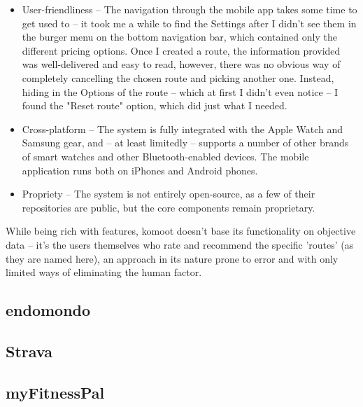 \begin{itemize}
    \item User-friendliness -- The navigation through the mobile app takes some time to get used to -- it took me a while to find the Settings after I didn't see them in the burger menu on the bottom navigation bar, which contained only the different pricing options.
    Once I created a route, the information provided was well-delivered and easy to read, however, there was no obvious way of completely cancelling the chosen route and picking another one.
    Instead, hiding in the Options of the route -- which at first I didn't even notice -- I found the "Reset route" option, which did just what I needed.
    \item Cross-platform -- The system is fully integrated with the Apple Watch and Samsung gear, and -- at least limitedly -- supports a number of other brands of smart watches and other Bluetooth-enabled devices.
    The mobile application runs both on iPhones and Android phones.
    \item Propriety -- The system is not entirely open-source, as a few of their repositories are public, but the core components remain proprietary. 
\end{itemize}

While being rich with features, komoot doesn't base its functionality on objective data -- it's the users themselves who rate and recommend the specific 'routes' (as they are named here),
an approach in its nature prone to error and with only limited ways of eliminating the human factor.

\subsection{endomondo}

\subsection{Strava}

\subsection{myFitnessPal}

